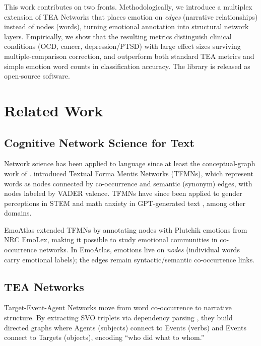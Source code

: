 \documentclass[11pt,a4paper]{article}
\begin{document}
This work contributes on two fronts.  Methodologically, we introduce a multiplex extension of TEA Networks that places emotion on \textit{edges} (narrative relationships) instead of nodes (words), turning emotional annotation into structural network layers.  Empirically, we show that the resulting metrics distinguish clinical conditions (OCD, cancer, depression/PTSD) with large effect sizes surviving multiple-comparison correction, and outperform both standard TEA metrics and simple emotion word counts in classification accuracy.  The library is released as open-source software.


\section{Related Work}

\subsection{Cognitive Network Science for Text}

Network science has been applied to language since at least the conceptual-graph work of \citet{sowa1984conceptual}.  \citet{stella2020formamentis} introduced Textual Forma Mentis Networks (TFMNs), which represent words as nodes connected by co-occurrence and semantic (synonym) edges, with nodes labeled by VADER valence.  TFMNs have since been applied to gender perceptions in STEM \citep{stella2020formamentis} and math anxiety in GPT-generated text \citep{stella2023gpt}, among other domains.

EmoAtlas \citep{stella2022emoatlas} extended TFMNs by annotating nodes with Plutchik emotions from NRC EmoLex, making it possible to study emotional communities in co-occurrence networks.  In EmoAtlas, emotions live on \textit{nodes} (individual words carry emotional labels); the edges remain syntactic/semantic co-occurrence links.

\subsection{TEA Networks}

Target-Event-Agent Networks \citep{franchini2026tea} move from word co-occurrence to narrative structure.  By extracting SVO triplets via dependency parsing \citep[spaCy;][]{honnibal2020spacy}, they build directed graphs where Agents (subjects) connect to Events (verbs) and Events connect to Targets (objects), encoding ``who did what to whom.''
\end{document}

